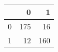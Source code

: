 \begin{tabular}{lrr}
\toprule
{} &    0 &    1 \\
\midrule
0 &  175 &   16 \\
1 &   12 &  160 \\
\bottomrule
\end{tabular}
